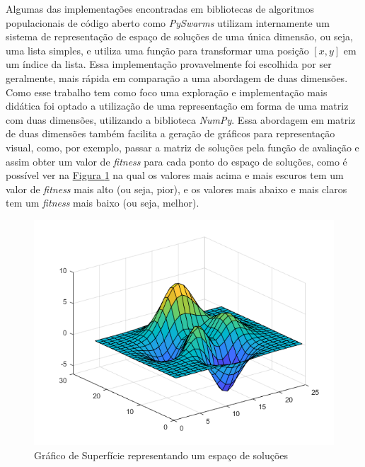 Algumas das implementações encontradas em bibliotecas de algoritmos populacionais de código aberto como \textit{PySwarms} utilizam internamente um sistema de representação de espaço de soluções de uma única dimensão, ou seja, uma lista simples, e utiliza uma função para transformar uma posição $[x,y]$ em um índice da lista. Essa implementação provavelmente foi escolhida por ser geralmente, mais rápida em comparação a uma abordagem de duas dimensões.\\
\indent Como esse trabalho tem como foco uma exploração e implementação mais didática foi optado a utilização de uma representação em forma de uma matriz com duas dimensões, utilizando a biblioteca \textit{NumPy}. Essa abordagem em matriz de duas dimensões também facilita a geração de gráficos para representação visual, como, por exemplo, passar a matriz de soluções pela função de avaliação e assim obter um valor de \textit{fitness} para cada ponto do espaço de soluções, como é possível ver na 
\hyperref[fig:surfaceplot]{Figura \ref{fig:surfaceplot}} 
na qual os valores mais acima e mais escuros tem um valor de \textit{fitness} mais alto (ou seja, pior), e os valores mais abaixo e mais claros tem um \textit{fitness} mais baixo (ou seja, melhor).

\begin{figure}[ht]
    \centering
    \caption{Gráfico de Superfície representando um espaço de soluções}
    \label{fig:surfaceplot}
    \includegraphics[width=\textwidth]{assets/surfaceplot.png}
\end{figure}

